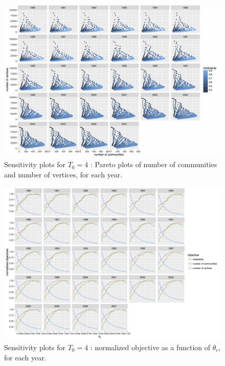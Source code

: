 \documentclass[12pt,twoside,a4paper]{article}
\begin{document}
\begin{figure}
\centering
\includegraphics[width=\textheight,height=\textwidth,angle=90]{vcount_comnum_pareto.jpg}
\caption{Sensitivity plots for $T_0 = 4$ : Pareto plots of number of communities and number of vertices, for each year.}
\label{fig:ext-sensitivity-2}
\end{figure}

\begin{figure}
\centering
\includegraphics[width=\textheight,height=\textwidth,angle=90]{normalizedObjs-dispth_eth4_1e-5.jpg}
\caption{Sensitivity plots for $T_0 = 4$ : normalized objective as a function of $\theta_c$, for each year.}
\label{fig:ext-sensitivity-3}
\end{figure}
\end{document}
